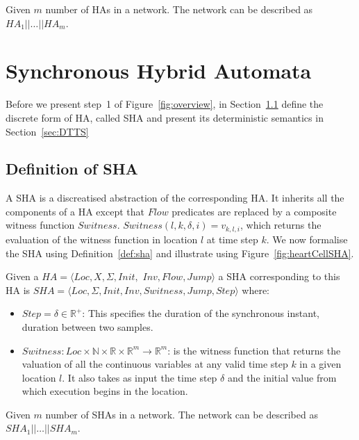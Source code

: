 Given  $m$   number of \acp{HA} in a network.
The network can be described as $HA_1 || \dots || HA_m$.


\section{Synchronous Hybrid Automata}
\label{sec:SHA}
 
Before we present step~1 of Figure~\ref{fig:overview},
in Section~\ref{sec:defSHA} define the discrete form of \ac{HA}, 
called \acf{SHA} and present its deterministic semantics in 
Section~\ref{sec:DTTS}

\subsection{Definition of \acf{SHA}}
\label{sec:defSHA}
A \ac{SHA} is a discreatised  abstraction of the corresponding \ac{HA}. 
It inherits all the
components of a \ac{HA} except that $Flow$ predicates are replaced by a
composite witness function $Switness$.
$Switness(l,k, \delta, i)=v_{k,l,i}$, which returns the evaluation of
the witness function in location $l$ at time step $k$.
We now formalise
the \ac{SHA} using Definition~\ref{def:sha} and illustrate using Figure~\ref{fig:heartCellSHA}.



\begin{definition}
	Given a 
	$HA = \langle Loc, X, \Sigma, Init,$ $ Inv, Flow, Jump \rangle$ a \ac{SHA} corresponding to
	this \ac{HA} is \newline
	$SHA = \langle Loc,  \Sigma, Init, Inv, Switness, Jump, Step \rangle$ where:
	\begin{itemize}
		\item $Step = \delta \in \mathbb{R}^+$: This specifies the duration of the synchronous instant,  duration between 
		two samples.
		\item
		$Switness: Loc \times \mathbb{N} \times \mathbb{R} \times
		\mathbb{R}^m \rightarrow \mathbb{R}^m$:
		is the witness function that returns the valuation of all the
		continuous variables at any valid time step $k$ in a given location
		$l$. It also takes as input the time step $\delta$ and the initial
		value from which execution begins in the location.
	\end{itemize}
	\label{def:sha}
\end{definition}

Given  $m$   number of \acp{SHA} in a network.
The network can be described as $SHA_1 || \dots || SHA_m$.

